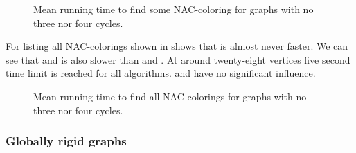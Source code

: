 \begin{figure}[thbp]
	\centering
	\scalebox{\BenchFigureScale}{}
	\caption[Mean runtime for graphs with no 3 nor 4 cycles (some)]{
		Mean running time to find some NAC-coloring for graphs with no three nor four cycles.}%
	\label{fig:graph_count_no_3_nor_4_cycles_first_runtime}
\end{figure}%

For listing all NAC-colorings shown
in 
shows that \NaiveCycles{} is almost never faster.
We can see that \None{} and \CyclesMatchChunks{} is also slower than
\Neighbors{} and \NeighborsDegree{}.
At around twenty-eight vertices five second time limit is reached for all algorithms.
\MergeLinear{} and \SharedVertices{} have no significant influence.
%
\begin{figure}[thbp]
	\centering
	\scalebox{\BenchFigureScale}{}
	\caption[Mean runtime for graphs with no 3 nor 4 cycles (all)]{
		Mean running time to find all NAC-colorings for graphs with no three nor four cycles.}%
	\label{fig:graph_count_no_3_nor_4_cycles_all_runtime}
\end{figure}%


\subsubsection*{Globally rigid graphs}

